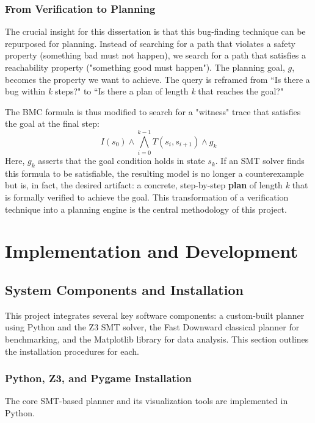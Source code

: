 \documentclass[12pt, a4paper, oneside]{report} %
\begin{document}
\subsection{From Verification to Planning}

The crucial insight for this dissertation is that this bug-finding technique can be repurposed for planning. Instead of searching for a path that violates a safety property (something bad must not happen), we search for a path that satisfies a reachability property ("something good must happen"). The planning goal, $g$, becomes the property we want to achieve. The query is reframed from ``Is there a bug within \textit{k} steps?" to ``Is there a plan of length \textit{k} that reaches the goal?"

The BMC formula is thus modified to search for a "witness" trace that satisfies the goal at the final step:
\[
I(s_0) \land \bigwedge_{i=0}^{k-1} T(s_i, s_{i+1}) \land g_k
\]
Here, $g_k$ asserts that the goal condition holds in state $s_k$. If an SMT solver finds this formula to be satisfiable, the resulting model is no longer a counterexample but is, in fact, the desired artifact: a concrete, step-by-step \textbf{plan} of length \textit{k} that is formally verified to achieve the goal. This transformation of a verification technique into a planning engine is the central methodology of this project.
\chapter{Implementation and Development}
\label{chap:implementation}

\section{System Components and Installation}
\label{sec:installation}

This project integrates several key software components: a custom-built planner using Python and the Z3 SMT solver, the Fast Downward classical planner for benchmarking, and the Matplotlib library for data analysis. This section outlines the installation procedures for each.

\subsection*{Python, Z3, and Pygame Installation}

The core SMT-based planner and its visualization tools are implemented in Python.
\end{document}
